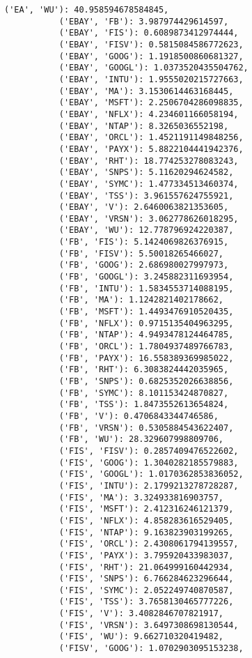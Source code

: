 \documentclass[11pt]{article}
\begin{document}
\begin{Verbatim}[commandchars=\\\{\}]
           ('EA', 'WU'): 40.958594678584845,
           ('EBAY', 'FB'): 3.987974429614597,
           ('EBAY', 'FIS'): 0.6089873412974444,
           ('EBAY', 'FISV'): 0.5815084586772623,
           ('EBAY', 'GOOG'): 1.1918500860681327,
           ('EBAY', 'GOOGL'): 1.0373520435504762,
           ('EBAY', 'INTU'): 1.9555020215727663,
           ('EBAY', 'MA'): 3.1530614463168445,
           ('EBAY', 'MSFT'): 2.2506704286098835,
           ('EBAY', 'NFLX'): 4.234601166058194,
           ('EBAY', 'NTAP'): 8.3265036552198,
           ('EBAY', 'ORCL'): 1.4521191149848256,
           ('EBAY', 'PAYX'): 5.8822104441942376,
           ('EBAY', 'RHT'): 18.774253278083243,
           ('EBAY', 'SNPS'): 5.11620294624582,
           ('EBAY', 'SYMC'): 1.477334513460374,
           ('EBAY', 'TSS'): 3.961557624755921,
           ('EBAY', 'V'): 2.6460063821353605,
           ('EBAY', 'VRSN'): 3.062778626018295,
           ('EBAY', 'WU'): 12.778796924220387,
           ('FB', 'FIS'): 5.1424069826376915,
           ('FB', 'FISV'): 5.50018265466027,
           ('FB', 'GOOG'): 2.686980027997973,
           ('FB', 'GOOGL'): 3.245882311693954,
           ('FB', 'INTU'): 1.5834553714088195,
           ('FB', 'MA'): 1.1242821402178662,
           ('FB', 'MSFT'): 1.4493476910520435,
           ('FB', 'NFLX'): 0.9715135404963295,
           ('FB', 'NTAP'): 4.9493478124464785,
           ('FB', 'ORCL'): 1.7804937489766783,
           ('FB', 'PAYX'): 16.558389369985022,
           ('FB', 'RHT'): 6.3083824442035965,
           ('FB', 'SNPS'): 0.6825352026638856,
           ('FB', 'SYMC'): 8.101153424870827,
           ('FB', 'TSS'): 1.8473552613654824,
           ('FB', 'V'): 0.4706843344746586,
           ('FB', 'VRSN'): 0.5305884543622407,
           ('FB', 'WU'): 28.329607998809706,
           ('FIS', 'FISV'): 0.2857409476522602,
           ('FIS', 'GOOG'): 1.3040282185579883,
           ('FIS', 'GOOGL'): 1.0170362853836052,
           ('FIS', 'INTU'): 2.1799213278728287,
           ('FIS', 'MA'): 3.324933816903757,
           ('FIS', 'MSFT'): 2.412316246121379,
           ('FIS', 'NFLX'): 4.858283616529405,
           ('FIS', 'NTAP'): 9.163823903199265,
           ('FIS', 'ORCL'): 2.4308061794139557,
           ('FIS', 'PAYX'): 3.795920433983037,
           ('FIS', 'RHT'): 21.064999160442934,
           ('FIS', 'SNPS'): 6.766284623296644,
           ('FIS', 'SYMC'): 2.052249740870587,
           ('FIS', 'TSS'): 3.7658130465777226,
           ('FIS', 'V'): 3.4082846707821917,
           ('FIS', 'VRSN'): 3.6497308698130544,
           ('FIS', 'WU'): 9.662710320419482,
           ('FISV', 'GOOG'): 1.0702903095153238,

\end{Verbatim}
\end{document}

